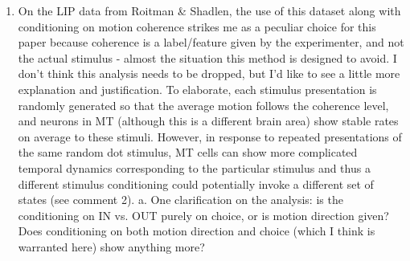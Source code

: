 \documentclass[12pt,a4paper]{article}
\begin{document}
\begin{enumerate}
\item On the LIP data from Roitman \& Shadlen, the use of this dataset along with conditioning on motion coherence strikes me as a peculiar choice for this paper because coherence is a label/feature given by the experimenter, and not the actual stimulus - almost the situation this method is designed to avoid. I don’t think this analysis needs to be dropped, but I’d like to see a little more explanation and justification. To elaborate, each stimulus presentation is randomly generated so that the average motion follows the coherence level, and neurons in MT (although this is a different brain area) show stable rates on average to these stimuli. However, in response to repeated presentations of the same random dot stimulus, MT cells can show more complicated temporal dynamics corresponding to the particular stimulus and thus a different stimulus conditioning could potentially invoke a different set of states (see comment 2).
a. One clarification on the analysis: is the conditioning on IN vs. OUT purely on choice, or is motion direction given? Does conditioning on both motion direction and choice (which I think is warranted here) show anything more?


\end{enumerate}
\end{document}
